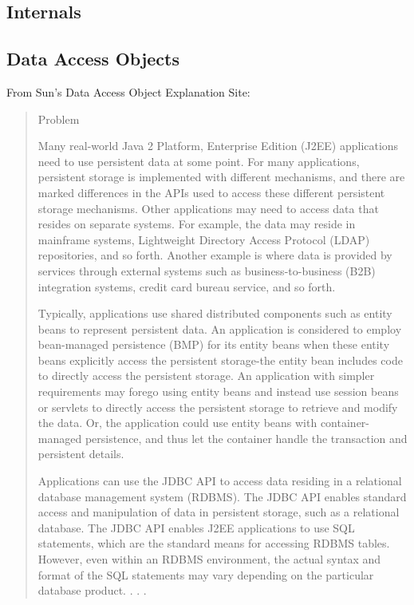 \documentclass[11pt]{report}
\begin{document}
\begin{flushleft}
\chapter{Internals}
    \section{Data Access Objects}
    From Sun's Data Access Object Explanation Site:

    \begin{quote}
        \begin{bf}Problem\end{bf}

        Many real-world Java 2 Platform, Enterprise Edition (J2EE)
        applications need to use persistent data at some point. For many
        applications, persistent storage is implemented with different
        mechanisms, and there are marked differences in the APIs used to
        access these different persistent storage mechanisms. Other
        applications may need to access data that resides on separate systems.
        For example, the data may reside in mainframe systems, Lightweight
        Directory Access Protocol (LDAP) repositories, and so forth.  Another
        example is where data is provided by services through external systems
        such as business-to-business (B2B) integration systems, credit card
        bureau service, and so forth.

        Typically, applications use shared distributed components such as
        entity beans to represent persistent data. An application is
        considered to employ bean-managed persistence (BMP) for its entity
        beans when these entity beans explicitly access the persistent
        storage-the entity bean includes code to directly access the
        persistent storage. An application with simpler requirements may
        forego using entity beans and instead use session beans or servlets to
        directly access the persistent storage to retrieve and modify the
        data. Or, the application could use entity beans with
        container-managed persistence, and thus let the container handle the
        transaction and persistent details.

        Applications can use the JDBC API to access data residing in a
        relational database management system (RDBMS). The JDBC API enables
        standard access and manipulation of data in persistent storage, such
        as a relational database. The JDBC API enables J2EE applications to
        use SQL statements, which are the standard means for accessing RDBMS
        tables. However, even within an RDBMS environment, the actual syntax
        and format of the SQL statements may vary depending on the particular
        database product.  . . . 


\end{quote}
\end{flushleft}
\end{document}

